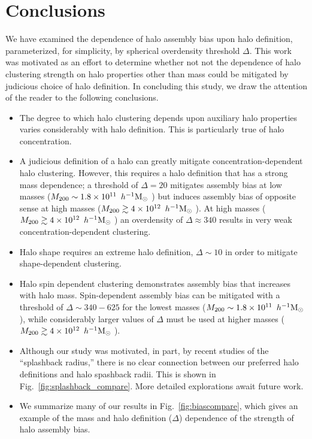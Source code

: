 \documentclass[usenatbib,fleqn]{mnras}
\begin{document}
\section[]{Conclusions}
\label{section:conclusions}

We have examined the dependence of halo assembly bias upon halo definition, parameterized, for simplicity, by spherical overdensity threshold $\Delta$. 
This work was motivated as an effort to determine whether not not the 
dependence of halo clustering strength on halo properties other than mass 
could be mitigated by judicious choice of halo definition. In concluding this study, we 
draw the attention of the reader to the following conclusions.

\begin{itemize}
    
  	\item The degree to which halo clustering depends upon auxiliary halo properties varies considerably with halo definition. This is particularly true of halo concentration. 
    
    \item A judicious definition of a halo can greatly mitigate concentration-dependent halo clustering. However, this requires a halo definition that has a strong mass dependence; a threshold of $\Delta=20$ mitigates assembly bias at low masses 
($M_{200} \sim 1.8 \times 10^{11}\, \ h^{-1}\mathrm{M}_{\odot}~$) but induces assembly bias of opposite sense at high masses 
($M_{200} \gtrsim 4 \times 10^{12}\, \ h^{-1}\mathrm{M}_{\odot}~$). 
At high masses 
($M_{200} \gtrsim 4 \times 10^{12}\, \ h^{-1}\mathrm{M}_{\odot}~$) 
an overdensity of $\Delta \approx 340$ results in 
very weak concentration-dependent clustering. 
    
    \item Halo shape requires an extreme halo definition, $\Delta \sim 10$ in order to mitigate shape-dependent clustering.
    
    \item Halo spin dependent clustering demonstrates assembly bias that increases with halo mass. Spin-dependent assembly bias can be mitigated with a threshold of 
$\Delta \sim 340-625$ for the lowest masses ($M_{200} \sim 1.8 \times10^{11}\, \ h^{-1}\mathrm{M}_{\odot}~$), while considerably larger values of $\Delta$ must be used at higher masses 
($M_{200} \gtrsim 4 \times 10^{12}\, \ h^{-1}\mathrm{M}_{\odot}~$). 

    \item Although our study was motivated, in part, by recent studies of the ``splashback radius,'' there is no clear connection between our preferred halo definitions and halo spashback radii. This is shown in Fig.~\ref{fig:splashback_compare}. More detailed explorations await future work.
    
    \item We summarize many of our results in Fig.~\ref{fig:biascompare}, which gives an example of the mass and halo definition ($\Delta$) dependence of the strength of halo assembly bias.
    
\end{itemize}
\end{document}
